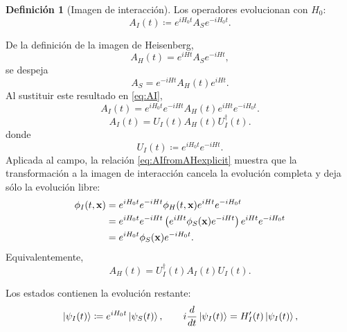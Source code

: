\documentclass[11pt,letterpaper]{article}
\theoremstyle{definition}
\newtheorem{definicion}{Definición}
\theoremstyle{definition}
\newcommand{\eqbox}[1]{\boxed{\displaystyle #1}}
\begin{document}
\begin{definicion}[Imagen de interacción]
Los operadores evolucionan con $H_0$:
\begin{equation}
  \eqbox{A_I(t)
  \coloneqq e^{iH_0t}A_Se^{-iH_0t}.}
  \label{eq:AI}
\end{equation}

De la definición de la imagen de Heisenberg,
\begin{equation}
  A_H(t)=e^{iHt}A_Se^{-iHt},
\end{equation}
se despeja
\begin{equation}
  A_S=e^{-iHt}A_H(t)e^{iHt}.
\end{equation}
Al sustituir este resultado en \eqref{eq:AI},
\begin{equation}
  \eqbox{A_I(t)
  =e^{iH_0t}e^{-iHt}A_H(t)e^{iHt}e^{-iH_0t}.}
  \label{eq:AIfromAHexplicit}
\end{equation}
\begin{equation}
  \eqbox{A_I(t)=U_I(t)A_H(t)U_I^\dagger(t).}
  \label{eq:AIfromAH}
\end{equation}
donde
\begin{equation}
  \eqbox{U_I(t)\coloneqq e^{iH_0t}e^{-iHt}.}
  \label{eq:UI}
\end{equation}
Aplicada al campo, la relación \eqref{eq:AIfromAHexplicit} muestra que la
transformación a la imagen de interacción cancela la evolución completa y deja
sólo la evolución libre:
\begin{align}
  \phi_I(t,\mathbf{x})
  &=e^{iH_0t}e^{-iHt}\phi_H(t,\mathbf{x})e^{iHt}e^{-iH_0t}
  \notag\\
  &=e^{iH_0t}e^{-iHt}
    \left(e^{iHt}\phi_S(\mathbf{x})e^{-iHt}\right)
    e^{iHt}e^{-iH_0t}
  \notag\\
  &=e^{iH_0t}\phi_S(\mathbf{x})e^{-iH_0t}.
  \label{eq:phiIfromphiH}
\end{align}
Equivalentemente,
\begin{equation}
  \eqbox{A_H(t)=U_I^\dagger(t)A_I(t)U_I(t).}
\end{equation}

Los estados contienen la evolución restante:
\begin{equation}
  \ket{\psi_I(t)}\coloneqq e^{iH_0t}\ket{\psi_S(t)},
  \qquad
  i\frac{d}{dt}\ket{\psi_I(t)}=H'_I(t)\ket{\psi_I(t)},
\end{equation}
\end{definicion}
\end{document}
